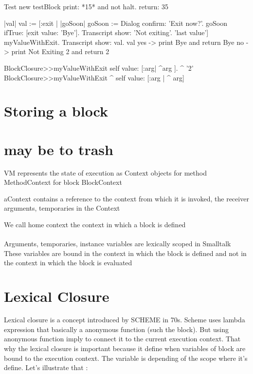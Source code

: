 \documentclass[a4paper,10pt,twoside]{book}
\begin{document}
\begin{code}{}
Test new testBlock 	
print: *15* and not halt. 
return: 35
\end{code}


\begin{code}{}
|val|
val := [:exit |
		|goSoon|
		goSoon := Dialog confirm: 'Exit now?'.
		goSoon ifTrue: [exit value: 'Bye'].
		Transcript show: 'Not exiting'.
		'last value'] myValueWithExit.
Transcript show: val.
val
yes -> print Bye and return  Bye
no -> print Not Exiting 2 and return 2
\end{code}

\begin{code}{}
BlockClosure>>myValueWithExit
	      self value: [:arg| ^arg ].
      ^ '2'
BlockClosure>>myValueWithExit
 ^ self value: [:arg | ^ arg]        
\end{code}



\section{Storing a block}


\section{may be to trash}
VM represents the state of execution as Context objects
for method MethodContext
for block BlockContext

aContext contains a reference to the context from which it is invoked, the receiver arguments, temporaries in the Context

We call home context the context in which a block is defined


\paragraph{}
Arguments, temporaries, instance variables are lexically scoped in Smalltalk
These variables are bound in the context in which the block is defined and not in the context in which the block is evaluated

\newpage
\section{Lexical Closure}
Lexical closure is a concept introduced by SCHEME in 70s. Scheme uses lambda expression that basically a anonymous function (such the block). But using anonymous function imply to connect it to the current execution context. That why the lexical closure is important because it define when variables of block are bound to the execution context. The variable is depending of the scope where it's define. Let's illustrate that :
\end{document}
